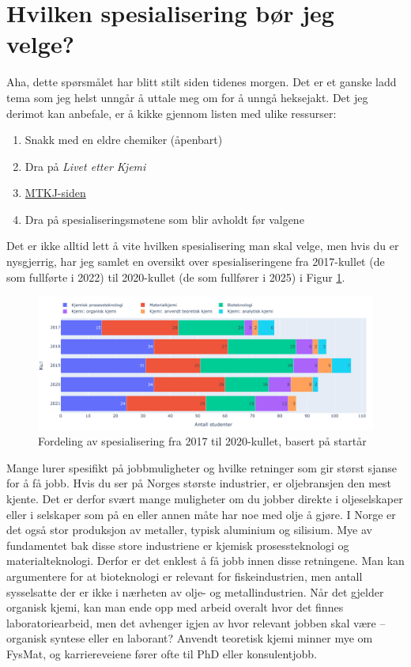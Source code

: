 \section{Hvilken spesialisering bør jeg velge?}

Aha, dette spørsmålet har blitt stilt siden tidenes morgen. Det er et ganske ladd tema som jeg helst unngår å uttale meg om for å unngå heksejakt. Det jeg derimot kan anbefale, er å kikke gjennom listen med ulike ressurser:

\begin{enumerate}
    \item Snakk med en eldre chemiker (åpenbart)
    \item Dra på \textit{Livet etter Kjemi}
    \item \href{https://www.ntnu.no/studier/mtkj/studiets-oppbygning}{MTKJ-siden}
    \item Dra på spesialiseringsmøtene som blir avholdt før valgene
\end{enumerate}

Det er ikke alltid lett å vite hvilken spesialisering man skal velge, men hvis du er nysgjerrig, har jeg samlet en oversikt over spesialiseringene fra 2017-kullet (de som fullførte i 2022) til 2020-kullet (de som fullfører i 2025) i Figur \ref{fig:Spesialisering-Stolpe}.

\begin{figure}[!h]
    \centering
    \includegraphics[width=1.1\textwidth]{images/Spesialisering_Stolpe.pdf}
    \caption{Fordeling av spesialisering fra 2017 til 2020-kullet, basert på startår\cite{Hege}}
    \label{fig:Spesialisering-Stolpe}
\end{figure}

Mange lurer spesifikt på jobbmuligheter og hvilke retninger som gir størst sjanse for å få jobb. Hvis du ser på Norges største industrier, er oljebransjen den mest kjente. Det er derfor svært mange muligheter om du jobber direkte i oljeselskaper eller i selskaper som på en eller annen måte har noe med olje å gjøre. I Norge er det også stor produksjon av metaller, typisk aluminium og silisium. Mye av fundamentet bak disse store industriene er kjemisk prosessteknologi og materialteknologi. Derfor er det enklest å få jobb innen disse retningene. Man kan argumentere for at bioteknologi er relevant for fiskeindustrien, men antall sysselsatte der er ikke i nærheten av olje- og metallindustrien. Når det gjelder organisk kjemi, kan man ende opp med arbeid overalt hvor det finnes laboratoriearbeid, men det avhenger igjen av hvor relevant jobben skal være – organisk syntese eller en laborant? Anvendt teoretisk kjemi minner mye om FysMat, og karriereveiene fører ofte til PhD eller konsulentjobb. 


